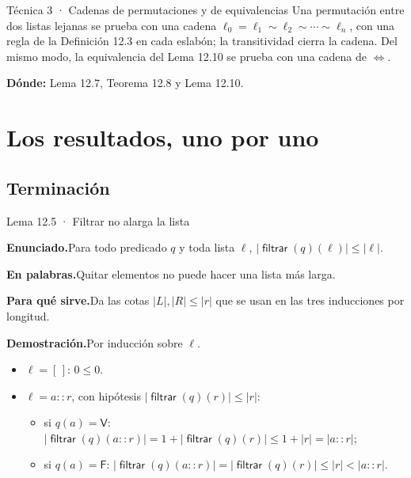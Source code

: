 \documentclass[11pt,a4paper]{article}
\newcommand{\campo}[1]{\par\smallskip\noindent\textbf{#1}\enspace}
\newcommand{\enunciado}{\campo{Enunciado.}}
\newcommand{\palabras}{\campo{En palabras.}}
\newcommand{\sirve}{\campo{Para qué sirve.}}
\newcommand{\prueba}{\campo{Demostración.}}
\newcommand{\Perm}{\sim}
\newcommand{\filt}{\operatorname{\mathsf{filtrar}}}
\newcommand{\len}[1]{\lvert #1\rvert}
\newcommand{\V}{\mathsf{V}}
\newcommand{\F}{\mathsf{F}}
\begin{document}
\begin{esquema}{Técnica 3 · Cadenas de permutaciones y de equivalencias}
Una permutación entre dos listas lejanas se prueba con una cadena
\(\ell_0=\ell_1\Perm\ell_2\Perm\cdots\Perm\ell_n\), con una regla de la
Definición 12.3 en cada eslabón; la transitividad cierra la cadena. Del mismo
modo, la equivalencia del Lema 12.10 se prueba con una cadena de \(\iff\).

\textbf{Dónde:} Lema 12.7, Teorema 12.8 y Lema 12.10.
\end{esquema}

\section{Los resultados, uno por uno}

\subsection{Terminación}

\begin{resultado}{Lema 12.5 · Filtrar no alarga la lista}
\enunciado Para todo predicado \(q\) y toda lista \(\ell\),
\(\len{\filt(q)(\ell)}\leq\len\ell\).

\palabras Quitar elementos no puede hacer una lista más larga.

\sirve Da las cotas \(\len L,\len R\leq\len r\) que se usan en las tres
inducciones por longitud.

\prueba Por inducción sobre \(\ell\).
\begin{itemize}
  \item \(\ell=[\,]\): \(0\leq0\).
  \item \(\ell=a::r\), con hipótesis \(\len{\filt(q)(r)}\leq\len r\):
    \begin{itemize}
      \item si \(q(a)=\V\):
        \(\len{\filt(q)(a::r)}=1+\len{\filt(q)(r)}\leq1+\len r=\len{a::r}\);
      \item si \(q(a)=\F\):
        \(\len{\filt(q)(a::r)}=\len{\filt(q)(r)}\leq\len r<\len{a::r}\).
    \end{itemize}
\end{itemize}
\end{resultado}
\end{document}
